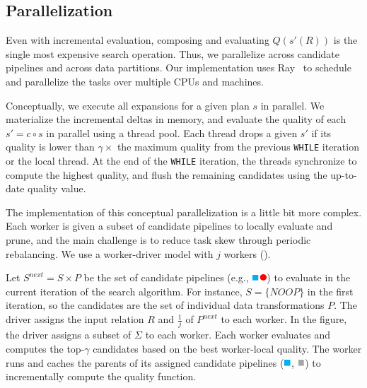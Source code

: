 \subsection{Parallelization} 
Even with incremental evaluation, composing and evaluating $Q(s'(R))$ is the single most expensive search operation.  Thus, we parallelize across candidate pipelines and across data partitions.  Our implementation uses Ray~\cite{ray} to schedule and parallelize the tasks over multiple CPUs and machines.

Conceptually, we execute all expansions for a given plan $s$ in parallel.  We materialize the incremental deltas in memory, and evaluate the quality of each $s' = c\circ s$ in parallel using a thread pool.  Each thread drops a given $s'$ if its quality is lower than $\gamma\times$ the maximum quality from the previous \texttt{WHILE} iteration or the local thread.  At the end of the \texttt{WHILE} iteration, the threads synchronize to compute the highest quality, and flush the remaining candidates using the up-to-date quality value.


The implementation of this conceptual parallelization is a little bit more complex. 
Each worker is given a subset of candidate pipelines to locally evaluate and prune, and the main challenge is to reduce task skew through periodic rebalancing.  We use a worker-driver model with $j$ workers ().

Let $S^{next} = S\times P$ be the set of candidate pipelines (e.g., \includegraphics[height=8pt]{figures/program.pdf}) to evaluate in the current iteration of the search algorithm. For instance, $S=\{NOOP\}$ in the first iteration, so the candidates are the set of individual data transformations $P$.   The driver assigns the input relation $R$ and $\frac{1}{j}$ of $P^{next}$ to each worker.  In the figure, the driver assigns a subset of $\Sigma$ to each worker.  Each worker evaluates and computes the top-$\gamma$ candidates based on the best worker-local quality.   The worker runs and caches the parents of its assigned candidate pipelines (\includegraphics[height=8pt]{figures/sq-blue.pdf}, \includegraphics[height=8pt]{figures/sq-grey.pdf}) to incrementally compute the quality function.
  

